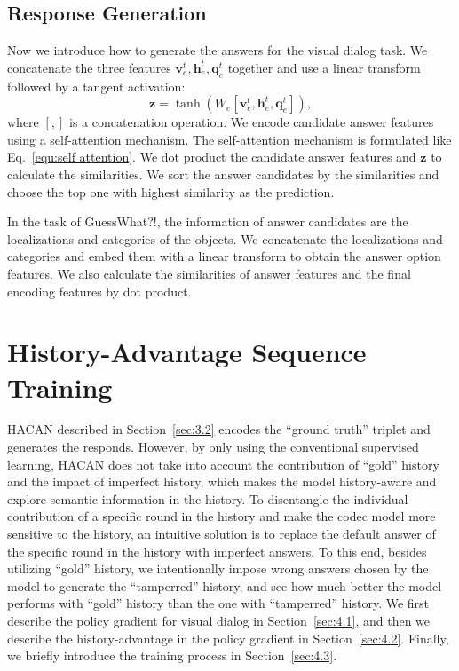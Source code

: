 \documentclass[10pt,twocolumn,letterpaper]{article}
\begin{document}
\subsection{Response Generation}\label{sec:3.3}
Now we introduce how to generate the answers for the visual dialog task. We concatenate the three features $\bm{v}^t_e, \bm{h}^t_e, \bm{q}^t_e$ together and use a linear transform followed by a tangent activation: 
\begin{equation}
\bm{z}=\tanh(W_{e}[\bm{v}^t_e, \bm{h}^t_e, \bm{q}^t_e]), \label{equ:fusion}
\end{equation}
where $[,]$ is a concatenation operation.
We encode candidate answer features using a self-attention mechanism. The self-attention mechanism is formulated like Eq.~\eqref{equ:self attention}. We dot product the candidate answer features and $\bm{z}$ to calculate the similarities. We sort the answer candidates by the similarities and choose the top one with highest similarity as the prediction.

In the task of GuessWhat?!, the information of answer candidates are the localizations and categories of the objects. We concatenate the localizations and categories and embed them with a linear transform to obtain the answer option features. We also calculate the similarities of answer features and the final encoding features by dot product.
\section{History-Advantage Sequence Training}\label{sec:4}
HACAN described in Section~\ref{sec:3.2} encodes the ``ground truth'' triplet and generates the responds. However, by only using the conventional supervised learning, HACAN does not take into account the contribution of ``gold'' history and the impact of imperfect history, which makes the model history-aware and explore semantic information in the history. To disentangle the individual contribution of a specific round in the history and make the codec model more sensitive to the history, an intuitive solution is to replace the default answer of the specific round in the history with imperfect answers. To this end, besides utilizing ``gold'' history, we intentionally impose wrong answers chosen by the model to generate the ``tamperred'' history, and see how much better the model performs with ``gold'' history than the one with ``tamperred'' history. We first describe the policy gradient for visual dialog in Section~\ref{sec:4.1}, and then we describe the history-advantage in the policy gradient in Section~\ref{sec:4.2}. Finally, we briefly introduce the training process in Section~\ref{sec:4.3}.
\end{document}
